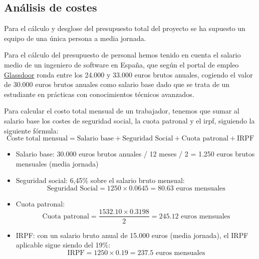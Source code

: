 \subsection{Análisis de costes}
\label{sec:presupuesto}
Para el cálculo y desglose del presupuesto total del proyecto se ha supuesto un equipo de una única persona a media jornada.

Para el cálculo del presupuesto de personal hemos tenido en cuenta el salario medio de un ingeniero de software en España, que según el portal de empleo \href{https://www.glassdoor.es/Sueldos/granada-software-engineer-sueldo-SRCH_IL.0,7_IC2614045_KO8,25.htm}{Glassdoor} ronda entre los 24.000 y 33.000 euros brutos anuales, cogiendo el valor de 30.000 euros brutos anuales como salario base dado que se trata de un estudiante en prácticas con conocimientos técnicos avanzados.

Para calcular el costo total mensual de un trabajador, tenemos que sumar al salario base los costes de seguridad social, la cuota patronal y el \acrshort{irpf}, siguiendo la siguiente fórmula:
\begin{equation}
    \text{Coste total mensual} = \text{Salario base} + \text{Seguridad Social} + \text{Cuota patronal} + \text{IRPF}
\end{equation}
\begin{itemize}
    \item Salario base: 30.000 euros brutos anuales / 12 meses / 2 = 1.250 euros brutos mensuales (media jornada)
    \item Seguridad social: 6,45\% sobre el salario bruto mensual:
        \begin{equation}
            \text{Seguridad Social} = 1250 \times 0.0645 = 80.63 \text{ euros mensuales}
        \end{equation}
    \item Cuota patronal: 
        \begin{equation}
            \text{Cuota patronal} = \dfrac{1532.10 \times 0.3198}{2} = 245.12 \text{ euros mensuales}
        \end{equation}
    \item IRPF: con un salario bruto anual de 15.000 euros (media jornada), el IRPF aplicable sigue siendo del 19\%:
        \begin{equation}
            \text{IRPF} = 1250 \times 0.19 = 237.5 \text{ euros mensuales}
        \end{equation}
\end{itemize}

